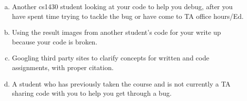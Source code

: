\documentclass[11pt]{article}
\newcommand{\cmark}{\ding{51}}%
\newcommand{\done}{\rlap{$\square$}{\raisebox{2pt}{\large\hspace{1pt}\cmark}}%
\hspace{-2.5pt}}
\begin{document}
\begin{enumerate}[(a)]
\item
Another cs1430 student looking at your code to help you debug, after you have spent time trying to tackle the bug or have come to TA office hours/Ed.

\begin{tcolorbox}[colback=white!5!white,colframe=green!75!black]
\end{tcolorbox}

\item
Using the result images from another student's code for your write up because your code is broken.

\begin{tcolorbox}[colback=white!5!white,colframe=green!75!black]
\end{tcolorbox}

\item
Googling third party sites to clarify concepts for written and code assignments, with proper citation.

\begin{tcolorbox}[colback=white!5!white,colframe=green!75!black]
\end{tcolorbox}

\item
A student who has previously taken the course and is not currently a TA sharing code with you to help you get through a bug.

\begin{tcolorbox}[colback=white!5!white,colframe=green!75!black]
\end{tcolorbox}

\end{enumerate}
\end{document}
